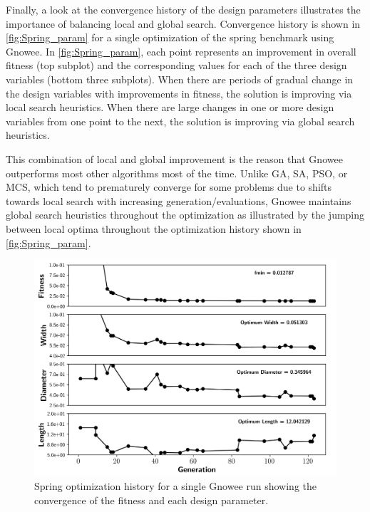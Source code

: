 \documentclass{article}                                                                           %
\begin{document}
Finally, a look at the convergence history of the design parameters illustrates the importance of balancing local and global search. 
Convergence history is shown in \autoref{fig:Spring_param} for a single optimization of the spring benchmark using Gnowee.  
In \autoref{fig:Spring_param}, each point represents an improvement in overall fitness (top subplot) and the corresponding values for each of the three design variables (bottom three subplots).  
When there are periods of gradual change in the design variables with improvements in fitness, the solution is improving via local search heuristics.
When there are large changes in one or more design variables from one point to the next, the solution is improving via global search heuristics.  

This combination of local and global improvement is the reason that Gnowee outperforms most other algorithms most of the time. 
Unlike GA, SA, PSO, or MCS, which tend to prematurely converge for some problems due to shifts towards local search with increasing generation/evaluations, Gnowee maintains global search heuristics throughout the optimization as illustrated by the jumping between local optima throughout the optimization history shown in \autoref{fig:Spring_param}. 

\begin{figure}[!t]
  \centering
  \includegraphics[width=4.5in]{../figs/Gnowee_Spring}
  \caption{Spring optimization history for a single Gnowee run showing the convergence of the fitness and each design parameter.}
  \label{fig:Spring_param}
\end{figure}
 
\end{document}
